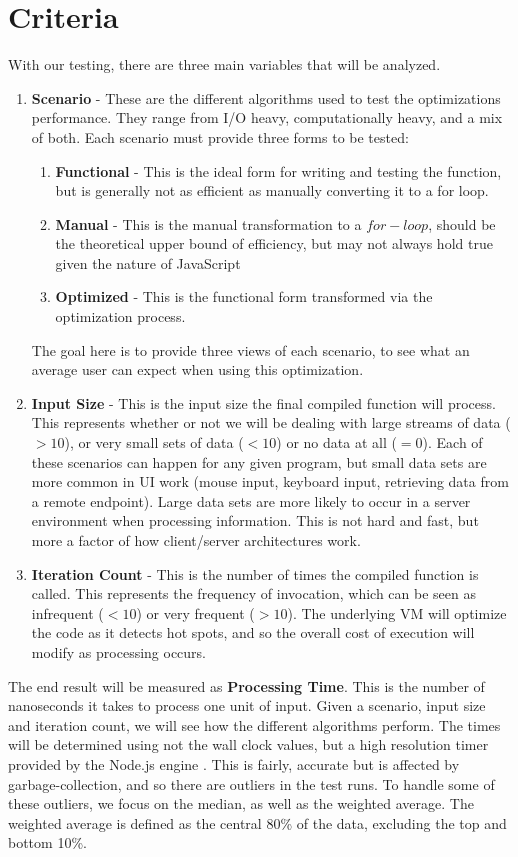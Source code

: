 \section{Criteria}

With our testing, there are three main variables that will be analyzed.

\begin{enumerate}
  \item \textbf{Scenario} - These are the different algorithms used to test the optimizations performance. They range from I/O heavy, computationally heavy, and a mix of both.  Each scenario must provide three forms to be tested:
    \begin{enumerate}
      \item \textbf{Functional} - This is the ideal form for writing and testing the function, but is generally not as efficient as manually converting it to a for loop.
      \item \textbf{Manual} - This is the manual transformation to a $for-loop$, should be the theoretical upper bound of efficiency, but may not always hold true given the nature of JavaScript
      \item \textbf{Optimized} - This is the functional form transformed via the optimization process.  
    \end{enumerate}
  The goal here is to provide three views of each scenario, to see what an average user can expect when using this optimization.
  \item \textbf{Input Size} - This is the input size the final compiled function will process.  This represents whether or not we will be dealing with large streams of data ($> 10$), or very small sets of data ($< 10$) or no data at all ($=0$).  Each of these scenarios can happen for any given program, but small data sets are more common in UI work (mouse input, keyboard input, retrieving data from a remote endpoint).  Large data sets are more likely to occur in a server environment when processing information. This is not hard and fast, but more a factor of how client/server architectures work. 
  \item \textbf{Iteration Count} - This is the number of times the compiled function is called.  This represents the frequency of invocation, which can be seen as infrequent ($< 10$) or very frequent ($> 10$).  The underlying VM will optimize the code as it detects hot spots, and so the overall cost of execution will modify as processing occurs.  
\end{enumerate}

The end result will be measured as \textbf{Processing Time}. This is the number of nanoseconds it takes to process one unit of input.  Given a scenario, input size and iteration count, we will see how the different algorithms perform.   The times will be determined using not the wall clock values, but a high resolution timer provided by the Node.js engine \cite{nodehr16}.  This is fairly, accurate but is affected by garbage-collection, and so there are outliers in the test runs. To handle some of these outliers, we focus on the median, as well as the weighted average. The weighted average is defined as the central 80\% of the data, excluding the top and bottom 10\%.
